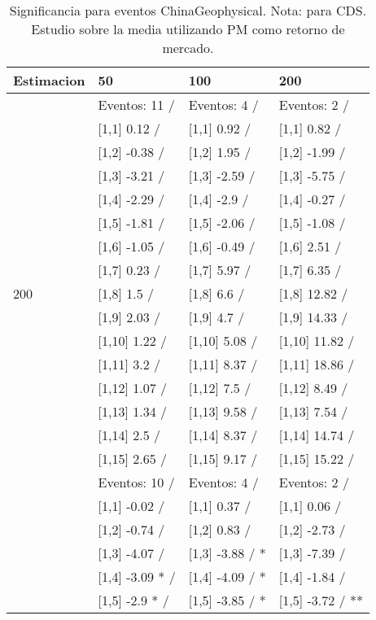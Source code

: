 \begin{table}

\caption{Significancia para eventos ChinaGeophysical. Nota: para CDS. Estudio sobre la media utilizando PM como retorno de mercado.}
\centering
\begin{tabular}[t]{llll}
\toprule
Estimacion & 50 & 100 & 200\\
\midrule
 & Eventos:  11 / & Eventos:  4 / & Eventos:  2 /\\
 & {}[1,1] 0.12  / & {}[1,1] 0.92  / & {}[1,1] 0.82  /\\
 & {}[1,2] -0.38  / & {}[1,2] 1.95  / & {}[1,2] -1.99  /\\
 & {}[1,3] -3.21  / & {}[1,3] -2.59  / & {}[1,3] -5.75  /\\
 & {}[1,4] -2.29  / & {}[1,4] -2.9  / & {}[1,4] -0.27  /\\
\addlinespace
 & {}[1,5] -1.81  / & {}[1,5] -2.06  / & {}[1,5] -1.08  /\\
 & {}[1,6] -1.05  / & {}[1,6] -0.49  / & {}[1,6] 2.51  /\\
 & {}[1,7] 0.23  / & {}[1,7] 5.97  / & {}[1,7] 6.35  /\\
200 & {}[1,8] 1.5  / & {}[1,8] 6.6  / & {}[1,8] 12.82  /\\
 & {}[1,9] 2.03  / & {}[1,9] 4.7  / & {}[1,9] 14.33  /\\
\addlinespace
 & {}[1,10] 1.22  / & {}[1,10] 5.08  / & {}[1,10] 11.82  /\\
 & {}[1,11] 3.2  / & {}[1,11] 8.37  / & {}[1,11] 18.86  /\\
 & {}[1,12] 1.07  / & {}[1,12] 7.5  / & {}[1,12] 8.49  /\\
 & {}[1,13] 1.34  / & {}[1,13] 9.58  / & {}[1,13] 7.54  /\\
 & {}[1,14] 2.5  / & {}[1,14] 8.37  / & {}[1,14] 14.74  /\\
\addlinespace
 & {}[1,15] 2.65  / & {}[1,15] 9.17  / & {}[1,15] 15.22  /\\
 & Eventos:  10 / & Eventos:  4 / & Eventos:  2 /\\
 & {}[1,1] -0.02  / & {}[1,1] 0.37  / & {}[1,1] 0.06  /\\
 & {}[1,2] -0.74  / & {}[1,2] 0.83  / & {}[1,2] -2.73  /\\
 & {}[1,3] -4.07  / & {}[1,3] -3.88  / * & {}[1,3] -7.39  /\\
\addlinespace
 & {}[1,4] -3.09 * / & {}[1,4] -4.09  / * & {}[1,4] -1.84  /\\
 & {}[1,5] -2.9 * / & {}[1,5] -3.85  / * & {}[1,5] -3.72  / **\\

\end{tabular}
\end{table}
